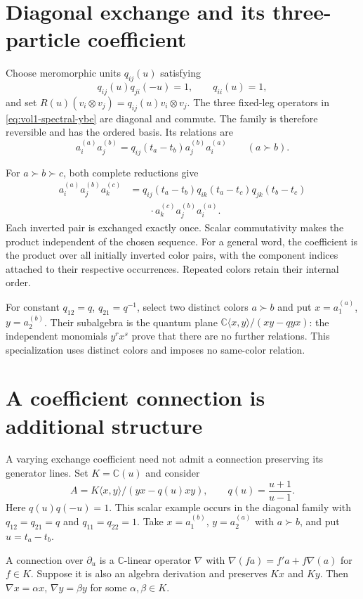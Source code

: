 \section{Diagonal exchange and its three-particle coefficient}
Choose meromorphic units $q_{ij}(u)$ satisfying
\[
 q_{ij}(u)q_{ji}(-u)=1,\qquad q_{ii}(u)=1,
\]
and set $R(u)(v_i\otimes v_j)=q_{ij}(u)v_i\otimes v_j$.
The three fixed-leg operators in \eqref{eq:vol1-spectral-ybe} are diagonal
and commute.  The family is therefore reversible and has the ordered basis.
Its relations are
\[
 a_i^{(a)}a_j^{(b)}
 =q_{ij}(t_a-t_b)a_j^{(b)}a_i^{(a)}\qquad(a\succ b).
\]

For $a\succ b\succ c$, both complete reductions give
\begin{equation}\label{cbc:spectral:triple}
 \begin{split}
 a_i^{(a)}a_j^{(b)}a_k^{(c)}
 &=q_{ij}(t_a-t_b)q_{ik}(t_a-t_c)q_{jk}(t_b-t_c)\\
 &\hspace{2em}\cdot a_k^{(c)}a_j^{(b)}a_i^{(a)}.
 \end{split}
\end{equation}
Each inverted pair is exchanged exactly once.  Scalar commutativity makes
the product independent of the chosen sequence.  For a general word,
the coefficient is the product over all initially inverted color pairs,
with the component indices attached to their respective occurrences.
Repeated colors retain their internal order.

For constant $q_{12}=q$, $q_{21}=q^{-1}$, select two distinct colors
$a\succ b$ and put $x=a_1^{(a)}$, $y=a_2^{(b)}$.
Their subalgebra is the quantum plane $\mathbb C\langle x,y\rangle/(xy-qyx)$:
the independent monomials $y^r x^s$ prove that there are no further relations.
This specialization uses distinct colors and imposes no same-color relation.

\section{A coefficient connection is additional structure}
A varying exchange coefficient need not admit a connection preserving its
generator lines.  Set $K=\mathbb C(u)$ and consider
\[
 A=K\langle x,y\rangle/(yx-q(u)xy),\qquad
 q(u)=\frac{u+1}{u-1}.
\]
Here $q(u)q(-u)=1$.  This scalar example occurs in the diagonal family with
$q_{12}=q_{21}=q$ and $q_{11}=q_{22}=1$.  Take $x=a_1^{(b)}$,
$y=a_2^{(a)}$ with $a\succ b$, and put $u=t_a-t_b$.

A connection over $\partial_u$ is a $\mathbb C$-linear operator $\nabla$ with
$\nabla(fa)=f'a+f\nabla(a)$ for $f\in K$.
Suppose it is also an algebra derivation and preserves $Kx$ and $Ky$.
Then $\nabla x=\alpha x$, $\nabla y=\beta y$ for some $\alpha,\beta\in K$.

